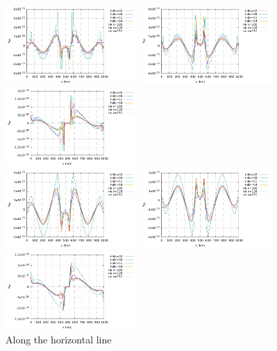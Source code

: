 \begin{center}
\includegraphics[width=5cm]{python_codes/fieldstone_26/results/case2b/horizontal_exx.pdf}
\includegraphics[width=5cm]{python_codes/fieldstone_26/results/case2b/horizontal_eyy.pdf}
\includegraphics[width=5cm]{python_codes/fieldstone_26/results/case2b/horizontal_exy.pdf}\\
\includegraphics[width=5cm]{python_codes/fieldstone_26/results/case2b/horizontal_exxn.pdf}
\includegraphics[width=5cm]{python_codes/fieldstone_26/results/case2b/horizontal_eyyn.pdf}
\includegraphics[width=5cm]{python_codes/fieldstone_26/results/case2b/horizontal_exyn.pdf}\\
{\captionfont Along the horizontal line}
\end{center}

